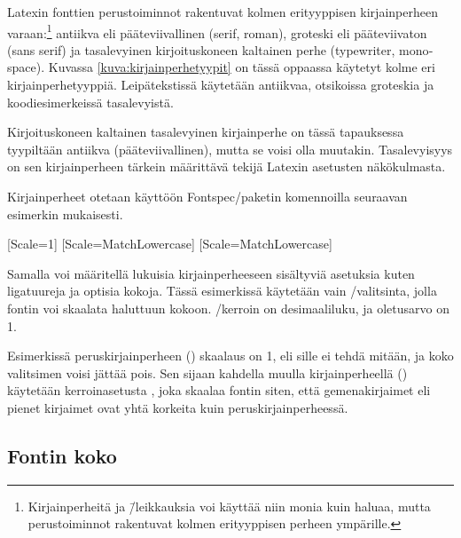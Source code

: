 Latexin fonttien perus\-toiminnot rakentuvat kolmen erityyppisen
kirjainperheen varaan:\footnote{Kirjainperheitä ja \=/leikkauksia voi
  käyttää niin monia kuin haluaa, mutta perustoiminnot rakentuvat kolmen
  erityyppisen perheen ympärille.} antiikva eli pääteviivallinen
(\textenglish{serif, roman}), groteski eli pääteviivaton
(\textenglish{sans serif}) ja tasalevyinen kirjoituskoneen kaltainen
perhe (\textenglish{typewriter, monospace}). Kuvassa
\ref{kuva:kirjainperhetyypit} on tässä oppaassa käytetyt kolme eri
kirjainperhetyyppiä. Leipätekstissä käytetään antiikvaa, otsikoissa
groteskia ja koodi\-esimerkeissä tasalevyistä.


Kirjoituskoneen kaltainen tasalevyinen kirjainperhe on tässä tapauksessa
tyypiltään antiikva (pääteviivallinen), mutta se voisi olla muutakin.
Tasalevyisyys on sen kirjainperheen tärkein määrittävä tekijä Latexin
asetusten näkökulmasta.

Kirjainperheet otetaan käyttöön Fontspec\-/paketin komennoilla seuraavan
esimerkin mukaisesti.

\begin{koodilohkosis}
  \usepackage{fontspec}
  \setmainfont{Linux Libertine O}[Scale=1]
  \setsansfont{Linux Biolinum O}[Scale=MatchLowercase]
  \setmonofont{Linux Libertine Mono O}[Scale=MatchLowercase]
\end{koodilohkosis}

Samalla voi määritellä lukuisia kirjainperheeseen sisältyviä asetuksia
kuten ligatuureja ja optisia kokoja. Tässä esimerkissä käytetään vain
\-/valitsinta, jolla fontin voi skaalata haluttuun kokoon.
\-/kerroin on desimaaliluku, ja oletus\-arvo on 1.

Esimerkissä peruskirjainperheen () skaalaus on 1, eli
sille ei tehdä mitään, ja koko valitsimen voisi jättää pois. Sen sijaan
kahdella muulla kirjainperheellä ()
käytetään ker\-roin\-ase\-tus\-ta , joka skaalaa
fontin siten, että gemenakirjaimet eli pienet kirjaimet ovat yhtä
korkeita kuin peruskirjainperheessä.

\subsection{Fontin koko}


